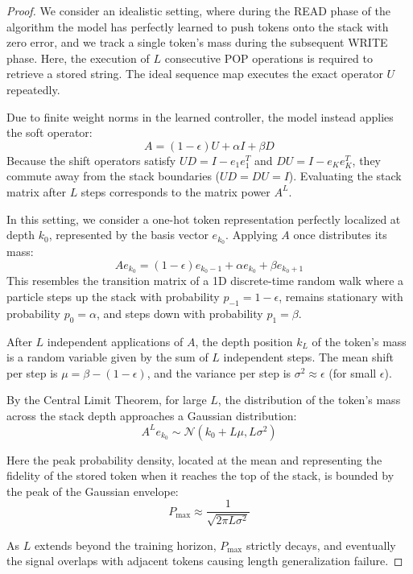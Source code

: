 \documentclass[11pt]{article}
\begin{document}
\begin{proof}
We consider an idealistic setting, where during the READ phase of the algorithm the model has perfectly learned to push tokens onto the stack with zero error, and we track a single token's mass during the subsequent WRITE phase. Here, the execution of $L$ consecutive $\text{POP}$ operations is required to retrieve a stored string. The ideal sequence map executes the exact operator $U$ repeatedly. 

Due to finite weight norms in the learned controller, the model instead applies the soft operator:
\begin{equation}
A = (1-\epsilon)U + \alpha I + \beta D
\end{equation}
Because the shift operators satisfy $UD = I - e_1e_1^T$ and $DU = I - e_K e_K^T$, they commute away from the stack boundaries ($UD = DU = I$). Evaluating the stack matrix after $L$ steps corresponds to the matrix power $A^L$.

In this setting, we consider a one-hot token representation perfectly localized at depth $k_0$, represented by the basis vector $e_{k_0}$. Applying $A$ once distributes its mass:
\begin{equation}
A e_{k_0} = (1-\epsilon)e_{k_0 - 1} + \alpha e_{k_0} + \beta e_{k_0 + 1}
\end{equation}
This resembles the transition matrix of a 1D discrete-time random walk where a particle steps up the stack with probability $p_{-1} = 1-\epsilon$, remains stationary with probability $p_0 = \alpha$, and steps down with probability $p_1 = \beta$.

After $L$ independent applications of $A$, the depth position $k_L$ of the token's mass is a random variable given by the sum of $L$ independent steps. The mean shift per step is $\mu = \beta - (1-\epsilon)$, and the variance per step is $\sigma^2 \approx \epsilon$ (for small $\epsilon$).

By the Central Limit Theorem, for large $L$, the distribution of the token's mass across the stack depth approaches a Gaussian distribution:
\begin{equation}
A^L e_{k_0} \sim \mathcal{N}(k_0 + L\mu, L\sigma^2)
\end{equation}

Here the peak probability density, located at the mean and representing the fidelity of the stored token when it reaches the top of the stack, is bounded by the peak of the Gaussian envelope:
\begin{equation}
P_{\text{max}} \approx \frac{1}{\sqrt{2\pi L \sigma^2}} 
\end{equation}

As $L$ extends beyond the training horizon, $P_{\text{max}}$ strictly decays, and eventually the signal overlaps with adjacent tokens causing length generalization failure.
\end{proof}
\end{document}
